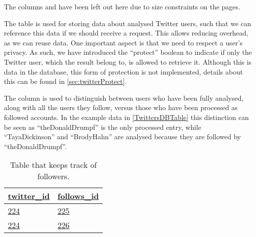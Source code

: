The columns  and  have been left out here
due to size constraints on the pages.

\begin{table}[H]
\centering
{}
\caption{Table containing Twitter users and their determined values.}
\label{TwittersDBTable}
\end{table}

The table  is used for storing data about analysed Twitter
users, such that we can reference this data if we should receive a request. This
allows reducing overhead, as we can reuse data. One important aspect is that we
need to respect a user's privacy. As such, we have introduced the ``protect''
boolean to indicate if only the Twitter user, which the result belong to, is
allowed to retrieve it. Although this is data in the database, this form of
protection is not implemented, details about this can be found in
\autoref{sec:twitterProtect}.\nl

The  column is used to distinguish between users who have been
fully analysed, along with all the users they follow, versus those who have been
processed as followed accounts. In the example data in \autoref{TwittersDBTable}
this distinction can be seen as ``theDonaldDrumpf'' is the only processed entry,
while ``TayaDickinson'' and ``BrodyHahn'' are analysed because they are followed
by ``theDonaldDrumpf''.


\begin{table}[H]
\centering
\begin{tabular}{| l | l |}
\hline
\textbf{\underline{twitter\_id}} & \textbf{\underline{follows\_id}} \\
\hline
\underline{224} & \underline{225} \\
\hline
\underline{224} & \underline{226} \\
\hline
\end{tabular}
\caption{Table that keeps track of followers.}
\label{TwitterTwitterDBTable}
\end{table}

